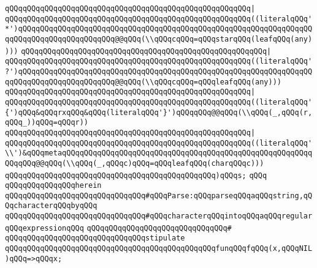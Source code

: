 \verb|qQQqqQQqqQQqqQQqqQQqqQQqqQQqqQQqqQQqqQQqqQQqqQQqqQQqqQQq|\verb#|#\newline
\verb|qQQqqQQqqQQqqQQqqQQqqQQqqQQqqQQqqQQqqQQqqQQqqQQqqQQqqQQq((literalqQQq'*')qQQqqQQqqQQqqQQqqQQqqQQqqQQqqQQqqQQqqQQqqQQqqQQqqQQqqQQqqQQqqQQqqQQqqQQqqQQqqQQqqQQqqQQqqQQq@@qQQq(\\qQQqcqQQq=qQQqstarqQQq(leafqQQq(any))))|\newline
\verb|qQQqqQQqqQQqqQQqqQQqqQQqqQQqqQQqqQQqqQQqqQQqqQQqqQQqqQQq|\verb#|#\newline
\verb|qQQqqQQqqQQqqQQqqQQqqQQqqQQqqQQqqQQqqQQqqQQqqQQqqQQqqQQq((literalqQQq'?')qQQqqQQqqQQqqQQqqQQqqQQqqQQqqQQqqQQqqQQqqQQqqQQqqQQqqQQqqQQqqQQqqQQqqQQqqQQqqQQqqQQqqQQqqQQq@@qQQq(\\qQQqcqQQq=qQQqleafqQQq(any)))|\newline
\verb|qQQqqQQqqQQqqQQqqQQqqQQqqQQqqQQqqQQqqQQqqQQqqQQqqQQqqQQq|\verb#|#\newline
\verb|qQQqqQQqqQQqqQQqqQQqqQQqqQQqqQQqqQQqqQQqqQQqqQQqqQQqqQQq((literalqQQq'{')qQQq&qQQqrxqQQq&qQQq(literalqQQq'}')qQQqqQQq@@qQQq(\\qQQq(_,qQQq(r,qQQq_))qQQq=qQQqr))|\newline
\verb|qQQqqQQqqQQqqQQqqQQqqQQqqQQqqQQqqQQqqQQqqQQqqQQqqQQqqQQq|\verb#|#\newline
\verb|qQQqqQQqqQQqqQQqqQQqqQQqqQQqqQQqqQQqqQQqqQQqqQQqqQQqqQQq((literalqQQq'\\')&qQQqmetaqQQqqQQqqQQqqQQqqQQqqQQqqQQqqQQqqQQqqQQqqQQqqQQqqQQqqQQqqQQqqQQq@@qQQq(\\qQQq(_,qQQqc)qQQq=qQQqleafqQQq(charqQQqc)))|\newline
\verb|qQQqqQQqqQQqqQQqqQQqqQQqqQQqqQQqqQQqqQQqqQQqqQQq)qQQqs;|\newline
\verb|qQQq|\newline
\verb|qQQqqQQqqQQqqQQqherein|\newline
\newline
\verb|qQQqqQQqqQQqqQQqqQQqqQQqqQQqqQQq#qQQqParse:qQQqparseqQQqaqQQqstring,qQQqcharacterqQQqbyqQQq|\newline
\verb|qQQqqQQqqQQqqQQqqQQqqQQqqQQqqQQq#qQQqcharacterqQQqintoqQQqaqQQqregularqQQqexpressionqQQq|\newline
\verb|qQQqqQQqqQQqqQQqqQQqqQQqqQQqqQQq#|\newline
\verb|qQQqqQQqqQQqqQQqqQQqqQQqqQQqqQQqstipulate|\newline
\newline
\verb|qQQqqQQqqQQqqQQqqQQqqQQqqQQqqQQqqQQqqQQqqQQqqQQqfunqQQqfqQQq(x,qQQqNIL)qQQq=>qQQqx;|\newline
